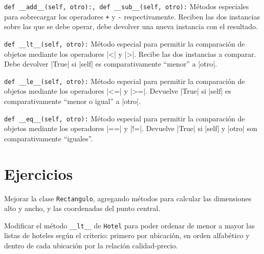 \begin{referencia_python}
\begin{sintaxis}{\lstinline!def __add__(self, otro):, def __sub__(self, otro):!}
Métodos especiales para sobrecargar los operadores \lstinline!+! y
\lstinline!-! respectivamente.  Reciben las dos instancias sobre las
que se debe operar, debe devolver una nueva instancia con el
resultado.
\end{sintaxis}

\begin{sintaxis}{\lstinline!def __lt__(self, otro):!}
Método especial para permitir la comparación de objetos mediante los
operadores |<| y |>|.  Recibe las dos instancias a
comparar. Debe devolver |True| si |self| es comparativamente
``menor'' a |otro|.
\end{sintaxis}

\begin{sintaxis}{\lstinline!def __le__(self, otro):!}
Método especial para permitir la comparación de objetos mediante los
operadores |<=| y |>=|. Devuelve |True| si |self| es comparativamente
``menor o igual'' a |otro|.
\end{sintaxis}

\begin{sintaxis}{\lstinline!def __eq__(self, otro):!}
Método especial para permitir la comparación de objetos mediante los operadores
|==| y |!=|. Devuelve |True| si |self| y |otro| son comparativamente
``iguales''.
\end{sintaxis}

\end{referencia_python}

\newpage
\section{Ejercicios}

\begin{ejercicio}
Mejorar la clase \lstinline|Rectangulo|, agregando métodos para calcular las
dimensiones alto y ancho, y las coordenadas del punto central.
\end{ejercicio}


\begin{ejercicio}
Modificar el método \lstinline!__lt__! de \lstinline!Hotel!
para poder ordenar de menor a mayor las listas de hoteles según el criterio:
primero por ubicación, en orden alfabético y dentro de cada ubicación por
la relación calidad-precio.
\end{ejercicio}


